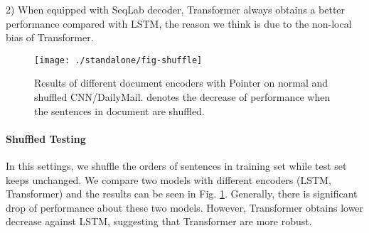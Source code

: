 \documentclass[11pt,a4paper]{article}
\begin{document}
2) When equipped with SeqLab decoder, Transformer always obtains a better performance compared with LSTM, the reason we think is due to the non-local bias \cite{wang2018non} of Transformer.



\begin{figure}
    \centering
    \texttt{[image: ./standalone/fig-shuffle]}
    \caption{Results of different document encoders with Pointer on normal and shuffled CNN/DailyMail.  denotes the decrease of performance when the sentences in document are shuffled. }
    \label{fig:shuffle}
\end{figure}






\paragraph{Shuffled Testing}

In this settings, we shuffle the orders of sentences in training set while test set keeps unchanged.
We compare two models with different encoders (LSTM, Transformer) and the results can be seen in Fig. \ref{fig:shuffle}.
Generally, there is significant drop of performance about these two models. However, Transformer obtains lower decrease against LSTM, suggesting that Transformer are more robust.

\renewcommand\arraystretch{1.2}
\begin{table}[t]
\center \footnotesize
{}
\caption{
Results of Transformer with SeqLab using different proportions of sentence embedding and positional embedding on CNN/DailyMail. The input of Transformer is   sentence embedding plus   positional embedding\protect\footnotemark{}. The bottom half of the table contains models that have similar performance with Transformer that only know positional information.
} \label{tab:disen}
\end{table}
\end{document}
